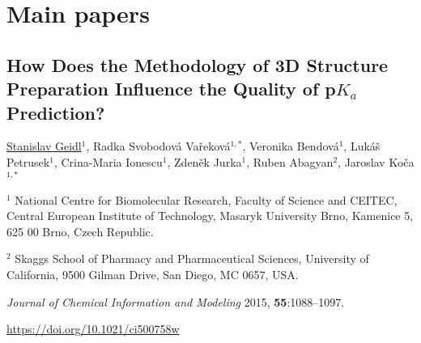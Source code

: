 \chapter{Main papers}
\label{chapter:papers}

\clearpage

\begin{center}
\section{\centering How Does the Methodology of 3D Structure
Preparation Influence the Quality of p$K_a$ Prediction?}
    
\underline{Stanislav Geidl$^1$}, Radka Svobodová Vařeková$^{1, *}$,
Veronika Bendová$^1$, Lukáš Petrusek$^1$, Crina-Maria Ionescu$^1$,
Zdeněk Jurka$^1$, Ruben Abagyan$^2$, Jaroslav Koča$^{1, *}$

\vspace{1cm}

$^1$ National Centre for Biomolecular Research, Faculty of Science and CEITEC,
Central European Institute of Technology, Masaryk University Brno, Kamenice 5,
625 00 Brno, Czech Republic.

$^2$ Skaggs School of Pharmacy and Pharmaceutical Sciences, University of
California, 9500 Gilman Drive, San Diego, MC 0657, USA.

\vspace{1cm}

\textit{Journal of Chemical Information and  Modeling} 2015, \textbf{55}:1088–1097.

\vspace{1cm}

\url{https://doi.org/10.1021/ci500758w}

\end{center}





